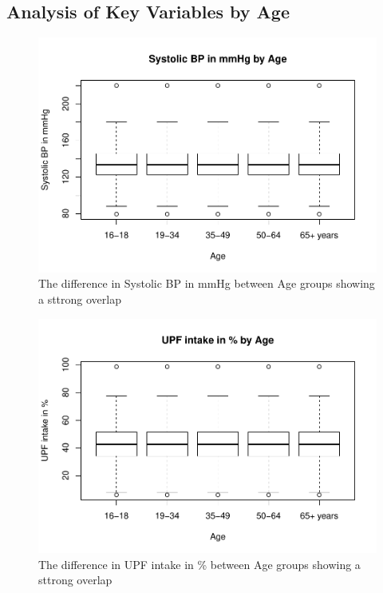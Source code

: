 \documentclass[
]{article}
\begin{document}
\hypertarget{analysis-of-key-variables-by-age}{%
\subsection{Analysis of Key Variables by
Age}\label{analysis-of-key-variables-by-age}}

\begin{figure}
\centering
\includegraphics{methodandresults_files/figure-latex/fig-BP-age-Boxplots-1.pdf}
\caption{The difference in Systolic BP in mmHg between Age groups
showing a sttrong overlap}
\end{figure}

\begin{figure}
\centering
\includegraphics{methodandresults_files/figure-latex/fig-UPF-age-Boxplots-1.pdf}
\caption{The difference in UPF intake in \% between Age groups showing a
sttrong overlap}
\end{figure}
\end{document}
